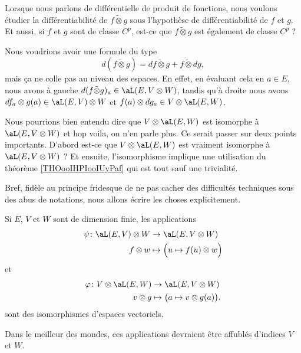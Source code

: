Lorsque nous parlons de différentielle de produit de fonctions, nous voulons étudier la différentiabilité de \( f\tilde\otimes g\) sous l'hypothèse de différentiabilité de \( f\) et \( g\). Et aussi, si \( f\) et \( g\) sont de classe \( C^p\), est-ce que \( f\tilde\otimes g\) est également de classe \( C^p\) ?

Nous voudrions avoir une formule du type
\begin{equation}
    d(f\tilde\otimes g)=df\tilde\otimes g+f\tilde\otimes dg,
\end{equation}
mais ça ne colle pas au niveau des espaces. En effet, en évaluant cela en \( a\in E\), nous avons à gauche \( d(f\tilde\otimes g)_a\in\aL(E,V\otimes W)\), tandis qu'à droite nous avons \( df_a\otimes g(a)\in \aL(E,V)\otimes W\) et \( f(a)\otimes dg_a\in V\otimes \aL(E,W)\).

Nous pourrions bien entendu dire que \( V\otimes \aL(E,W)\) est isomorphe à \( \aL(E,V\otimes W)\) et hop voila, on n'en parle plus. Ce serait passer sur deux points importants. D'abord est-ce que \( V\otimes \aL(E,W)\) est vraiment isomorphe à \( \aL(E,V\otimes W)\) ? Et ensuite, l'isomorphisme implique une utilisation du théorème \ref{THOooIHPIooIUyPaf} qui est tout sauf une trivialité.

Bref, fidèle au principe fridesque de ne pas cacher des difficultés techniques sous des abus de notations, nous allons écrire les choses explicitement.

\begin{lemma}
    Si \( E\), \( V\) et \( W\) sont de dimension finie, les applications
    \begin{equation}        \label{EQooVWXRooCesUqH}
        \begin{aligned}
            \psi\colon \aL(E,V)\otimes W&\to \aL(E,V\otimes W) \\
            f\otimes w&\mapsto \Big( u\mapsto f(u)\otimes w \Big) 
        \end{aligned}
    \end{equation}
    et
    \begin{equation}
        \begin{aligned}
            \varphi\colon V\otimes \aL(E,W)&\to \aL(E,V\otimes W) \\
            v\otimes g&\mapsto \big( a\mapsto v\otimes g(a) \big). 
        \end{aligned}
    \end{equation}
    sont des isomorphismes d'espaces vectoriels.
\end{lemma}
Dans le meilleur des mondes, ces applications devraient être affublés d'indices \( V\) et \( W\).

